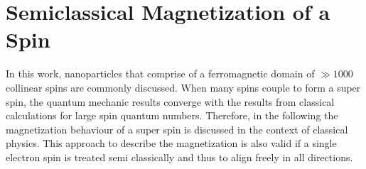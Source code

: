 \documentclass[\main/dresen_thesis.tex]{subfiles}
\begin{document}
  \section{Semiclassical Magnetization of a Spin}
    \label{ch:appendix:calculations:magnetizationClassicalSpin}
    In this work, nanoparticles that comprise of a ferromagnetic domain of $\gg 1000$ collinear spins are commonly discussed.
    When many spins couple to form a super spin, the quantum mechanic results converge with the results from classical calculations for large spin quantum numbers.
    Therefore, in the following the magnetization behaviour of a super spin is discussed in the context of classical physics.
    This approach to describe the magnetization is also valid if a single electron spin is treated semi classically and thus to align freely in all directions.
\end{document}

